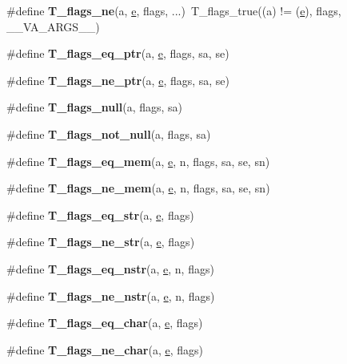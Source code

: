 \begin{DoxyCompactItemize}
\item 
\mbox{\label{group__RTEMSTestFrameworkImpl_ga3f24577076edd3e1db39b474fe9c21a0}} 
\#define {\bfseries T\+\_\+flags\+\_\+ne}(a,  \mbox{\hyperlink{sun4u_2tte_8h_a8b0b9ed08e0e18920ec2682f48228c27}{e}},  flags, ...)~T\+\_\+flags\+\_\+true((a) != (\mbox{\hyperlink{sun4u_2tte_8h_a8b0b9ed08e0e18920ec2682f48228c27}{e}}), flags, \+\_\+\+\_\+\+V\+A\+\_\+\+A\+R\+G\+S\+\_\+\+\_\+)
\item 
\#define {\bfseries T\+\_\+flags\+\_\+eq\+\_\+ptr}(a,  \mbox{\hyperlink{sun4u_2tte_8h_a8b0b9ed08e0e18920ec2682f48228c27}{e}},  flags,  sa,  se)
\item 
\#define {\bfseries T\+\_\+flags\+\_\+ne\+\_\+ptr}(a,  \mbox{\hyperlink{sun4u_2tte_8h_a8b0b9ed08e0e18920ec2682f48228c27}{e}},  flags,  sa,  se)
\item 
\#define {\bfseries T\+\_\+flags\+\_\+null}(a,  flags,  sa)
\item 
\#define {\bfseries T\+\_\+flags\+\_\+not\+\_\+null}(a,  flags,  sa)
\item 
\#define {\bfseries T\+\_\+flags\+\_\+eq\+\_\+mem}(a,  \mbox{\hyperlink{sun4u_2tte_8h_a8b0b9ed08e0e18920ec2682f48228c27}{e}},  n,  flags,  sa,  se,  sn)
\item 
\#define {\bfseries T\+\_\+flags\+\_\+ne\+\_\+mem}(a,  \mbox{\hyperlink{sun4u_2tte_8h_a8b0b9ed08e0e18920ec2682f48228c27}{e}},  n,  flags,  sa,  se,  sn)
\item 
\#define {\bfseries T\+\_\+flags\+\_\+eq\+\_\+str}(a,  \mbox{\hyperlink{sun4u_2tte_8h_a8b0b9ed08e0e18920ec2682f48228c27}{e}},  flags)
\item 
\#define {\bfseries T\+\_\+flags\+\_\+ne\+\_\+str}(a,  \mbox{\hyperlink{sun4u_2tte_8h_a8b0b9ed08e0e18920ec2682f48228c27}{e}},  flags)
\item 
\#define {\bfseries T\+\_\+flags\+\_\+eq\+\_\+nstr}(a,  \mbox{\hyperlink{sun4u_2tte_8h_a8b0b9ed08e0e18920ec2682f48228c27}{e}},  n,  flags)
\item 
\#define {\bfseries T\+\_\+flags\+\_\+ne\+\_\+nstr}(a,  \mbox{\hyperlink{sun4u_2tte_8h_a8b0b9ed08e0e18920ec2682f48228c27}{e}},  n,  flags)
\item 
\#define {\bfseries T\+\_\+flags\+\_\+eq\+\_\+char}(a,  \mbox{\hyperlink{sun4u_2tte_8h_a8b0b9ed08e0e18920ec2682f48228c27}{e}},  flags)
\item 
\#define {\bfseries T\+\_\+flags\+\_\+ne\+\_\+char}(a,  \mbox{\hyperlink{sun4u_2tte_8h_a8b0b9ed08e0e18920ec2682f48228c27}{e}},  flags)
\item 

\end{DoxyCompactItemize}
